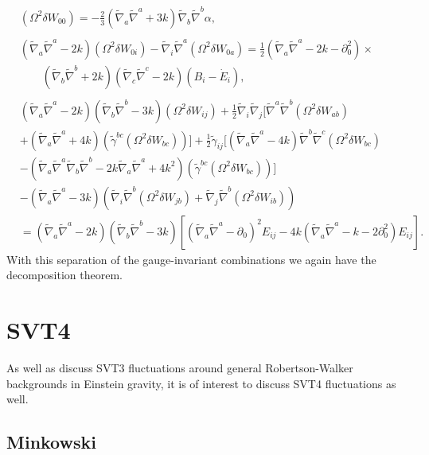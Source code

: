 \begin{align}
&(\Omega^2\delta W_{00})= - \tfrac{2}{3}  (\tilde\nabla_a\tilde\nabla^a + 3k)\tilde\nabla_b\tilde\nabla^b \alpha,
\nonumber\\
\nonumber\\
&(\tilde\nabla_a\tilde\nabla^a-2k)(\Omega^2\delta W_{0i}) - \tilde\nabla_i \tilde\nabla^a (\Omega^2\delta W_{0a}) =
\tfrac{1}{2} (\tilde\nabla_a\tilde\nabla^a - 2k - \partial_0^2)\times
\nonumber\\
&\qquad(\tilde\nabla_b\tilde\nabla^b + 2k)
(\tilde\nabla_c\tilde\nabla^c -2k)(B_i-\dot{E}_i),
\nonumber\\
\nonumber\\
&(\tilde\nabla_a\tilde\nabla^a-2k)(\tilde\nabla_b\tilde\nabla^b-3k)(\Omega^2\delta W_{ij})
+ \tfrac{1}{2} \tilde\nabla_i\tilde\nabla_j\big[ \tilde\nabla^a\tilde\nabla^b (\Omega^2\delta W_{ab})
\nonumber\\
& + (\tilde\nabla_a\tilde\nabla^a +4k)(\tilde{\gamma}^{bc}(\Omega^2\delta W_{bc}))\big]
+\tfrac{1}{2} \tilde{\gamma}_{ij} \big[ (\tilde\nabla_a\tilde\nabla^a-4k)\tilde\nabla^b\tilde\nabla^c (\Omega^2\delta W_{bc})
\nonumber\\
&-(\tilde\nabla_a\tilde\nabla^a\tilde\nabla_b\tilde\nabla^b -2k \tilde\nabla_a\tilde\nabla^a +4k^2)(\tilde{\gamma}^{bc}(\Omega^2\delta W_{bc}))\big]
\nonumber\\
&-(\tilde\nabla_a\tilde\nabla^a -3k)(\tilde\nabla_i\tilde\nabla^b (\Omega^2\delta W_{jb}) + \tilde\nabla_j \tilde\nabla^b (\Omega^2\delta W_{ib}))
\nonumber\\
&=(\tilde\nabla_a\tilde\nabla^a-2k)(\tilde\nabla_b\tilde\nabla^b-3k)\left[ (\tilde\nabla_a\tilde\nabla^a-\partial_0)^2 E_{ij} - 4k (\tilde\nabla_a\tilde\nabla^a - k-2\partial_0^2)E_{ij} \right].
\label{13.17}
\end{align}
%
With this separation of the gauge-invariant combinations we again have the decomposition theorem. 



\section{SVT4}
\label{s:svt4}
As well as discuss SVT3 fluctuations around general Robertson-Walker backgrounds in Einstein gravity,  it is of interest to discuss SVT4 fluctuations  as well.
\subsection{Minkowski}
\label{ss:minkowski_svt4}


